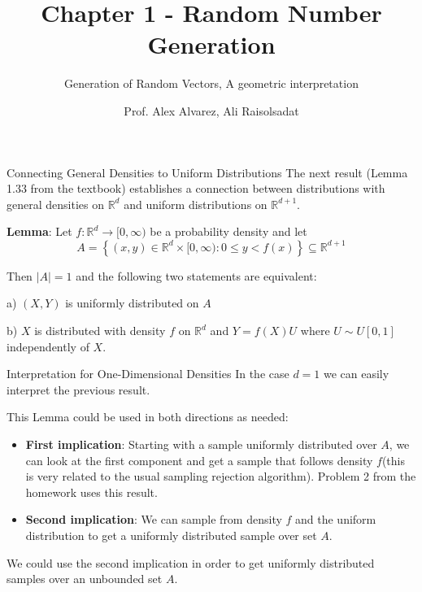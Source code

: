 \documentclass[8pt]{beamer}
\title{Chapter 1 - Random Number Generation}
\subtitle{Generation of Random Vectors, A geometric interpretation}
\author{Prof. Alex Alvarez, Ali Raisolsadat}
\institute{School of Mathematical and Computational Sciences \\ University of Prince Edward Island}
\date{} %
\begin{document}
\maketitle

\begin{frame}{Connecting General Densities to Uniform Distributions}
The next result (Lemma 1.33 from the textbook) establishes a connection between distributions with general densities on $\mathbb{R}^d$ and uniform distributions on $\mathbb{R}^{d+1}$.

\vspace{2mm}

\textbf{Lemma}: Let $f: \mathbb{R}^d \rightarrow [0, \infty)$ be a probability density and let 
\begin{equation*}
A=\left\{(x,y) \in \mathbb{R}^d\times [0,\infty) : 0 \leq y <f(x)\right\} \subseteq \mathbb{R}^{d+1}
\end{equation*}

Then $|A|=1$ and the following two statements are equivalent:\\
\vspace{2mm}

a) $(X,Y)$ is uniformly distributed on $A$\\
\vspace{2mm}

b) $X$ is distributed with density $f$ on $\mathbb{R}^d$ and $Y=f(X)U$ where $U \sim U[0,1]$ independently of $X$.
\vspace{2mm}
\end{frame}

\begin{frame}{Interpretation for One-Dimensional Densities}
In the case $d=1$ we can easily interpret the previous result.

\vspace{2mm}

This Lemma could be used in both directions as needed:

\begin{itemize}
	\item \textbf{First implication}: Starting with a sample uniformly  distributed over $A$, we can look at the first component and get a sample that follows density $f$(this is very related to the usual sampling rejection algorithm).
Problem 2 from the homework uses this result.

\pause

	\item \textbf{Second implication}: We can sample from density $f$ and the uniform distribution to get a uniformly distributed sample over set $A$.
\end{itemize}

We could use the second implication in order to get uniformly  distributed samples over an \alert{unbounded} set $A$.
\end{frame}
\end{document}
